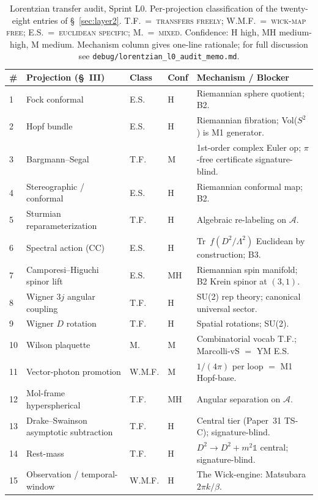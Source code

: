 \documentclass[11pt]{article}
\begin{document}
\begin{table}[h]
\centering\footnotesize
\caption{Lorentzian transfer audit, Sprint L0.  Per-projection
classification of the twenty-eight entries of \S~\ref{sec:layer2}.
T.F.~=~\textsc{transfers freely}; W.M.F.~=~\textsc{wick-map free};
E.S.~=~\textsc{euclidean specific}; M.~=~\textsc{mixed}.  Confidence:
H high, MH medium-high, M medium.  Mechanism column gives one-line
rationale; for full discussion see \texttt{debug/lorentzian\_l0\_audit\_memo.md}.}
\label{tab:lorentzian_transfer}
\begin{tabular}{p{0.4cm} p{4.3cm} p{0.8cm} p{0.5cm} p{8cm}}
\toprule
\# & Projection (\S~III) & Class & Conf & Mechanism / Blocker \\
\midrule
1 & Fock conformal & E.S. & H & Riemannian sphere quotient; B2. \\
2 & Hopf bundle & E.S. & H & Riemannian fibration; Vol($S^2$) is M1 generator. \\
3 & Bargmann--Segal & T.F. & M & 1st-order complex Euler op; $\pi$-free certificate signature-blind. \\
4 & Stereographic / conformal & E.S. & H & Riemannian conformal map; B2. \\
5 & Sturmian reparameterization & T.F. & H & Algebraic re-labeling on $\mathcal{A}$. \\
6 & Spectral action (CC) & E.S. & H & Tr~$f(D^2/\Lambda^2)$ Euclidean by construction; B3. \\
7 & Camporesi--Higuchi spinor lift & E.S. & MH & Riemannian spin manifold; B2 Krein spinor at $(3,1)$. \\
8 & Wigner $3j$ angular coupling & T.F. & H & SU(2) rep theory; canonical universal sector. \\
9 & Wigner $D$ rotation & T.F. & H & Spatial rotations; SU(2). \\
10 & Wilson plaquette & M. & M & Combinatorial vocab T.F.; Marcolli-vS $=$ YM E.S. \\
11 & Vector-photon promotion & W.M.F. & M & $1/(4\pi)$ per loop $=$ M1 Hopf-base. \\
12 & Mol-frame hyperspherical & T.F. & MH & Angular separation on $\mathcal{A}$. \\
13 & Drake--Swainson asymptotic subtraction & T.F. & H & Central tier (Paper~31 TS-C); signature-blind. \\
14 & Rest-mass & T.F. & H & $D^2 \to D^2 + m^2\mathbb{1}$ central; signature-blind. \\
15 & Observation / temporal-window & W.M.F. & H & The Wick-engine: Matsubara $2\pi k/\beta$. \\

\end{tabular}
\end{table}
\end{document}
